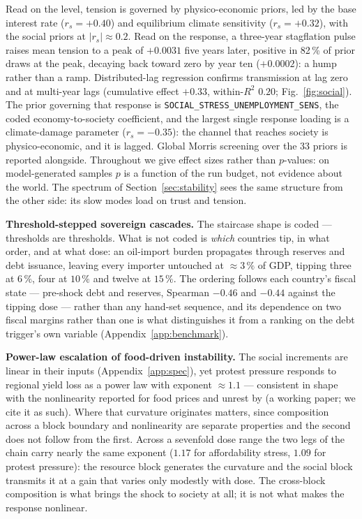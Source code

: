 \documentclass[a4paper,fleqn]{cas-sc}
\begin{document}
Read on the level, tension is governed by physico-economic priors, led by the base interest rate
($r_s=+0.40$) and equilibrium climate sensitivity ($r_s=+0.32$), with the social priors at
$|r_s|\approx0.2$. Read on the response, a three-year stagflation pulse raises mean tension to a
peak of $+0.0031$ five years later, positive in 82\,\% of prior draws at the peak, decaying back
toward zero by year ten ($+0.0002$): a hump rather than a ramp. Distributed-lag regression
confirms transmission at lag zero and at multi-year lags (cumulative effect $+0.33$,
within-$R^2$ $0.20$; Fig.~\ref{fig:social}). The prior governing that response is
\texttt{SOCIAL\_STRESS\_UNEMPLOYMENT\_SENS}, the coded economy-to-society coefficient, and the
largest single response loading is a climate-damage parameter ($r_s=-0.35$): the channel that
reaches society is physico-economic, and it is lagged. Global Morris screening over the 33 priors
\citep{morris1991,campolongo2007} is reported alongside. Throughout we give effect sizes rather
than $p$-values: on model-generated samples $p$ is a function of the run budget, not evidence
about the world. The spectrum of
Section~\ref{sec:stability} sees the same structure from the other side: its slow modes load on
trust and tension.

\textbf{Threshold-stepped sovereign cascades.} The staircase shape is coded --- thresholds
are thresholds. What is not coded is \emph{which} countries tip, in what order, and at what
dose: an oil-import burden propagates through reserves and debt issuance, leaving every importer
untouched at ${\approx}3\,\%$ of GDP, tipping three at $6\,\%$, four at $10\,\%$ and twelve at
$15\,\%$. The ordering follows each country's fiscal state --- pre-shock debt and reserves,
Spearman $-0.46$ and $-0.44$ against the tipping dose --- rather than any hand-set sequence, and
its dependence on two fiscal margins rather than one is what distinguishes it from a ranking on
the debt trigger's own variable (Appendix~\ref{app:benchmark}).

\textbf{Power-law escalation of food-driven instability.} The social increments are linear in
their inputs (Appendix~\ref{app:spec}), yet protest pressure responds to regional yield loss as a
power law with exponent ${\approx}1.1$ --- consistent in shape with the nonlinearity reported for
food prices and unrest by \citet{lagi2011food} (a working paper; we cite it as such). Where that
curvature originates matters, since composition across a block boundary and nonlinearity are
separate properties and the second does not follow from the first. Across a
sevenfold dose range the two legs of the chain carry nearly the same exponent ($1.17$ for
affordability stress, $1.09$ for protest pressure): the resource block generates the curvature and
the social block transmits it at a gain that varies only modestly with dose. The cross-block
composition is what brings the shock to society at all; it is not what makes the response
nonlinear.
\end{document}
